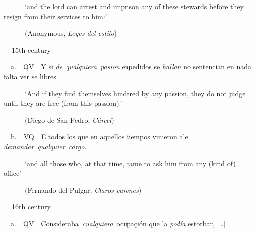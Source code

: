 \begin{styleStandard}
\ \ \ \ \ \ ‘and the lord can arrest and imprison any of these stewards before they resign from their services to him:’
\end{styleStandard}

\begin{styleStandard}
\ \ \ \ \ \ (Anonymous, \textit{Leyes del estilo})
\end{styleStandard}

\begin{styleStandard}
\textbf{\ \ }15th century
\end{styleStandard}

\begin{styleStandard}
\ \ a.\ \ QV\ \ Y si \textit{de~qualquiera~pasion} enpedidos se \textit{hallan} no sentencian en nada falta ver se libres. 
\end{styleStandard}

\begin{styleStandard}
\ \ \ \ \ \ ‘And if they find themselves hindered by any passion, they do not judge until they are free (from this passion).’
\end{styleStandard}

\begin{styleStandard}
\ \ \ \ \ \ (Diego de San Pedro, \textit{Cárcel})
\end{styleStandard}

\begin{styleStandard}
\ \ b.\ \ VQ\ \ E todos los que en aquellos tiempos vinieron ale \textit{demandar}~\textit{qualquier~cargo}. 
\end{styleStandard}

\begin{styleStandard}
\ \ \ \ \ \ ‘and all those who, at that time, came to ask him from any (kind of) office’
\end{styleStandard}

\begin{styleStandard}
\ \ \ \ \ \ (Fernando del Pulgar, \textit{Claros varones})
\end{styleStandard}

\begin{styleStandard}
\textbf{\ \ }16th century
\end{styleStandard}

\begin{styleStandard}
\ \ a.\ \ QV\ \ Consideraba~\textit{cualquiera}~ocupaçión que la \textit{podía} estorbar, […]
\end{styleStandard}

